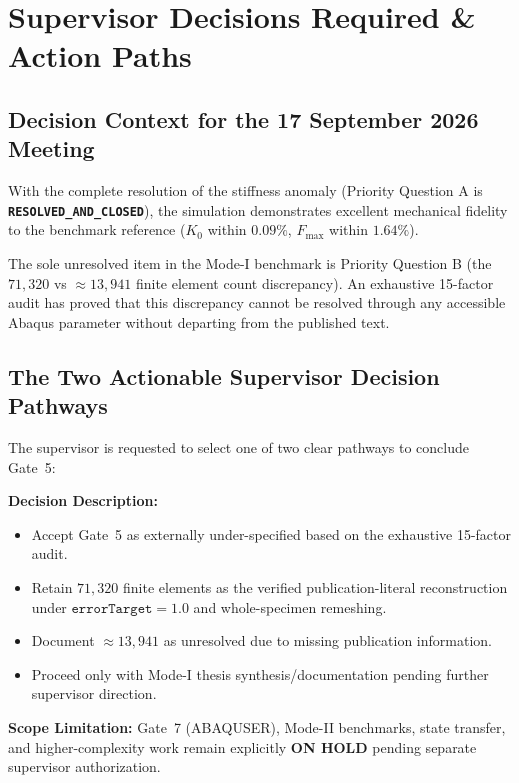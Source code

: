 \section{Supervisor Decisions Required \& Action Paths}
\label{sec:supervisor_decisions}

\subsection{Decision Context for the 17 September 2026 Meeting}
With the complete resolution of the stiffness anomaly (Priority Question A is \textbf{\texttt{RESOLVED\_AND\_CLOSED}}), the simulation demonstrates excellent mechanical fidelity to the benchmark reference ($K_0$ within $0.09\%$, $F_{\max}$ within $1.64\%$). 

The sole unresolved item in the Mode-I benchmark is Priority Question B (the $71{,}320$ vs $\approx 13{,}941$ finite element count discrepancy). An exhaustive 15-factor audit has proved that this discrepancy cannot be resolved through any accessible Abaqus parameter without departing from the published text.

\subsection{The Two Actionable Supervisor Decision Pathways}
The supervisor is requested to select one of two clear pathways to conclude Gate~5:

\begin{tcolorbox}[colback=blue!4!white,colframe=blue!75!black,title=\textbf{Option A: Accept Gate 5 as Externally Under-Specified \& Proceed with Mode-I Synthesis},top=1.5pt,bottom=1.5pt,left=3pt,right=3pt]
\textbf{Decision Description:}
\begin{itemize}[leftmargin=4mm,itemsep=0.5pt,topsep=1pt]
  \item Accept Gate~5 as externally under-specified based on the exhaustive 15-factor audit.
  \item Retain $71{,}320$ finite elements as the verified publication-literal reconstruction under $\texttt{errorTarget}=1.0$ and whole-specimen remeshing.
  \item Document $\approx 13{,}941$ as unresolved due to missing publication information.
  \item Proceed only with Mode-I thesis synthesis/documentation pending further supervisor direction.
\end{itemize}
\textbf{Scope Limitation:} Gate~7 (ABAQUSER), Mode-II benchmarks, state transfer, and higher-complexity work remain explicitly \textbf{ON HOLD} pending separate supervisor authorization.
\end{tcolorbox}

